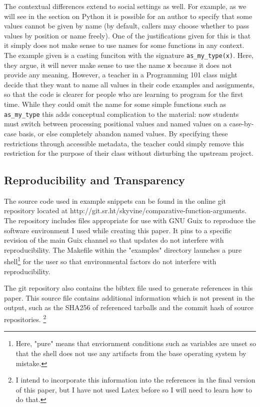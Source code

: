 The contextual differences extend to social settings as well.
For example, as we will see in the section on Python it is possible for an author to
specify that some values cannot be given by name (by default, callers may choose whether
to pass values by position or name freely).
One of the justifications given for this is that it simply does not make sense to use
names for some functions in any context.
The example given is a casting funciton with the signature \texttt{as\_my\_type(x)}.
Here, they argue, it will never make sense to use the name \texttt{x} because it does not
provide any meaning.
However, a teacher in a Programming 101 class might decide that they want to name all
values in their code examples and assignments, so that the code is clearer for people who
are learning to program for the first time.
While they could omit the name for some simple functions such as \texttt{as\_my\_type}
this adds conceptual complication to the material: now students must switch between
processing positional values and named values on a case-by-case basis, or else
completely abandon named values.
By specifying these restrictions through accessible metadata, the teacher could simply
remove this restriction for the purpose of their class without disturbing the upstream
project.

\subsection{Reproducibility and Transparency}

The source code used in example snippets can be found in the online git repository located
at http://git.sr.ht/\texttildelow{}skyvine/comparative-function-arguments.
The repository includes files appropriate for use with GNU Guix to reproduce the software
environment I used while creating this paper.
It pins to a specific revision of the main Guix channel so that updates do not interfere
with reproducibility.
The Makefile within the "examples" directory launches a pure shell\footnote{
	Here, "pure" means that enviornment conditions such as variables are unset so that the
	shell does not use any artifacts from the base operating system by mistake.
}
for the user so that
environmental factors do not interfere with reproducibility.

The git repository also contains the bibtex file used to generate references in this
paper.
This source file contains additional information which is not present in the output, such
as the SHA256 of referenced tarballs and the commit hash of source repositories.
\footnote {
	I intend to incorporate this information into the references in the final version of
	this paper, but I have not used Latex before so I will need to learn how to do that.
}

